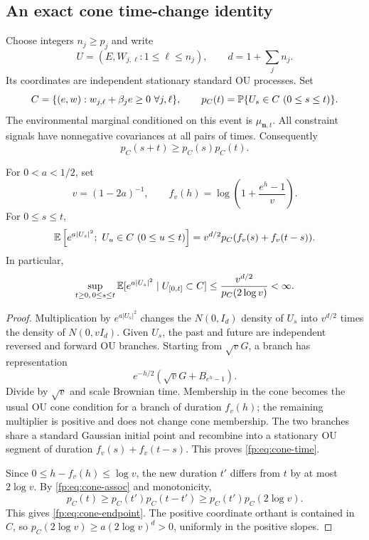 \subsection{An exact cone time-change identity}
Choose integers $n_j\ge p_j$ and write
\[
 U=(E,W_{j,\ell}:1\le\ell\le n_j),\qquad
 d=1+\sum_jn_j.
\]
Its coordinates are independent stationary standard OU processes. Set
\[
 C=\{(e,w):w_{j,\ell}+\beta_je\ge0\ \forall j,\ell\},\qquad
 p_C(t)=\mathbb P\{U_s\in C\ (0\le s\le t)\}.
\]
The environmental marginal conditioned on this event is $\mu_{\mathbf n,t}$. All constraint signals have nonnegative covariances at all pairs of times. Consequently
\begin{equation}\label{fp:eq:cone-assoc}
 p_C(s+t)\ge p_C(s)p_C(t).
\end{equation}

\begin{lemma}\label{fp:lem:cone-time}
For $0<a<1/2$, set
\[
 v=(1-2a)^{-1},\qquad
 f_v(h)=\log\left(1+\frac{e^h-1}{v}\right).
\]
For $0\le s\le t$,
\begin{equation}\label{fp:eq:cone-time}
 \mathbb E\left[e^{a|U_s|^2};\ U_u\in C\ (0\le u\le t)\right]
 =v^{d/2}p_C(f_v(s)+f_v(t-s)).
\end{equation}
In particular,
\begin{equation}\label{fp:eq:cone-endpoint}
 \sup_{t\ge0,\,0\le s\le t}
 \mathbb E[e^{a|U_s|^2}\mid U_{[0,t]}\subset C]
 \le\frac{v^{d/2}}{p_C(2\log v)}<\infty.
\end{equation}
\end{lemma}
\begin{proof}
Multiplication by $e^{a|U_s|^2}$ changes the $N(0,I_d)$ density of $U_s$ into $v^{d/2}$ times the density of $N(0,vI_d)$. Given $U_s$, the past and future are independent reversed and forward OU branches. Starting from $\sqrt vG$, a branch has representation
\[
 e^{-h/2}(\sqrt vG+B_{e^h-1}).
\]
Divide by $\sqrt v$ and scale Brownian time. Membership in the cone becomes the usual OU cone condition for a branch of duration $f_v(h)$; the remaining multiplier is positive and does not change cone membership. The two branches share a standard Gaussian initial point and recombine into a stationary OU segment of duration $f_v(s)+f_v(t-s)$. This proves \eqref{fp:eq:cone-time}.

Since $0\le h-f_v(h)\le\log v$, the new duration $t'$ differs from $t$ by at most $2\log v$. By \eqref{fp:eq:cone-assoc} and monotonicity,
\[
 p_C(t)\ge p_C(t')p_C(t-t')\ge p_C(t')p_C(2\log v).
\]
This gives \eqref{fp:eq:cone-endpoint}. The positive coordinate orthant is contained in $C$, so $p_C(2\log v)\ge a(2\log v)^d>0$, uniformly in the positive slopes.
\end{proof}

